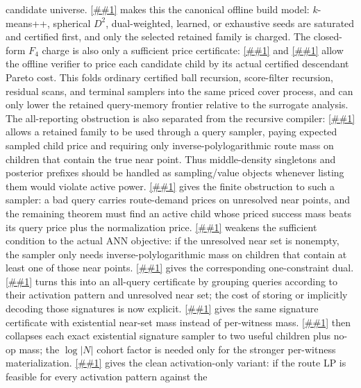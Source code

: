 \documentclass[10pt]{article}
\newcommand{\cref}[1]{\ref{##1}}
\newcommand{\Cref}[1]{\ref{##1}}
\theoremstyle{definition}
\begin{document}
candidate universe.  \Cref{cor:seed-saturate-certify} makes this the canonical
offline build model: $k$-means++, spherical \(D^2\), dual-weighted, learned, or
exhaustive seeds are saturated and certified first, and only the selected
retained family is charged.  The closed-form $F_4$ charge is also only a
sufficient price certificate: \cref{lem:priced-cover-compiler} and
\cref{cor:offline-recursive-pareto-pricing} allow the offline verifier to price
each candidate child by its actual certified descendant Pareto cost.  This
folds ordinary certified ball recursion, score-filter recursion, residual
scans, and terminal samplers into the same priced cover process, and can only
lower the retained query-memory frontier relative to the surrogate analysis.
The all-reporting obstruction is also separated from the recursive compiler:
\cref{lem:sampled-priced-cover} allows a retained family to be used through a
query sampler, paying expected sampled child price and requiring only
inverse-polylogarithmic route mass on children that contain the true near point.
Thus middle-density singletons and posterior prefixes should be handled as
sampling/value objects whenever listing them would violate active power.
\Cref{lem:finite-sampled-cover-dual} gives the finite obstruction to such a
sampler: a bad query carries route-demand prices on unresolved near points, and
the remaining theorem must find an active child whose priced success mass beats
its query price plus the normalization price.
\Cref{lem:existential-sampled-priced-cover} weakens the sufficient condition to
the actual ANN objective: if the unresolved near set is nonempty, the sampler
only needs inverse-polylogarithmic mass on children that contain at least one
of those near points.  \Cref{lem:finite-existential-sampled-cover-dual} gives
the corresponding one-constraint dual.
\Cref{lem:finite-sampled-route-verifier} turns this into an all-query
certificate by grouping queries according to their activation pattern and
unresolved near set; the cost of storing or implicitly decoding those signatures
is now explicit.
\Cref{lem:finite-existential-sampled-route-verifier} gives the same signature
certificate with existential near-set mass instead of per-witness mass.
\Cref{lem:two-child-existential-sampler} then collapses each exact existential
signature sampler to two useful children plus no-op mass; the \(\log |N|\)
cohort factor is needed only for the stronger per-witness materialization.
\Cref{lem:activation-sampled-route-verifier} gives the clean activation-only
variant: if the route LP is feasible for every activation pattern against the
\end{document}
